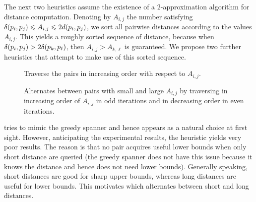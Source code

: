 The next two heuristics assume the existence of a $2$-approximation algorithm for distance
computation. Denoting by $A_{i,j}$ the number satisfying $\delta(p_i,p_j)\leqslant A_{i,j}\leqslant 2 d(p_i,p_j)$,
we sort all pairwise distances according to the values $A_{i,j}$.
This yields a roughly sorted sequence of distance, because when $\delta(p_i,p_j)>2\delta(p_k,p_\ell)$,
then $A_{i,j}>A_{k,\ell}$ is guaranteed.
We propose two further heuristics that attempt to make use of this sorted sequence.
\begin{description}
\item [\bqsgrdy] Traverse the pairs in increasing order with respect to $A_{i,j}$.
\item [\bqsshaker] Alternates between pairs with small and large $A_{i,j}$
by traversing in increasing order of $A_{i,j}$ in odd iterations and in decreasing order
in even iterations.
\end{description}

\bqsgrdy tries to mimic the greedy spanner and hence appears as a natural
choice at first sight. However, anticipating the experimental results, the heuristic yields very poor
results. The reason is that no pair acquires useful lower bounds when only short distance are queried
(the greedy spanner does not have this issue because it knows the distance and hence does not need
lower bounds).
Generally speaking, short distances are good for sharp upper bounds, whereas long distances are
useful for lower bounds. This motivates \bqsshaker
which alternates between short and long distances.



